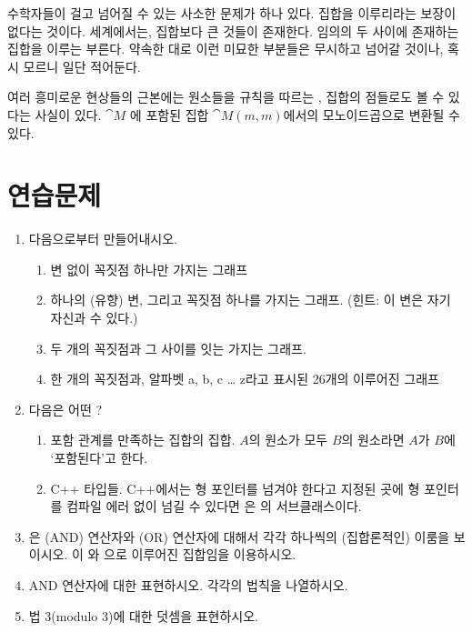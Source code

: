 \noindent
수학자들이 걸고 넘어질 수 있는 사소한 문제가 하나 있다.  집합을 이루리라는 보장이 없다는 것이다.
 세계에서는, 집합보다 큰 것들이 존재한다. 임의의 두 \trObject 사이에 존재하는  집합을 이루는   부른다.
약속한 대로 이런 미묘한 부분들은 무시하고 넘어갈 것이나, 혹시 모르니 일단 적어둔다.

 여러 흥미로운 현상들의 근본에는  원소들을  규칙을 따르는 , 집합의 점들로도 볼 수 있다는 사실이 있다.
$\cat{M}$ 에 포함된   집합 $\cat{M}(m, m)$에서의 모노이드곱으로 변환될 수 있다.

\section{연습문제}

\begin{enumerate}
\tightlist
\item
  다음으로부터  만들어내시오.  

  \begin{enumerate}
  \tightlist
  \item
    변 없이 꼭짓점 하나만 가지는 그래프
  \item
    하나의 (유향) 변, 그리고 꼭짓점 하나를 가지는 그래프.
    (힌트: 이 변은 자기 자신과  수 있다.)
  \item
    두 개의 꼭짓점과 그 사이를 잇는  가지는 그래프.
  \item
    한 개의 꼭짓점과, 알파벳 a, b, c \ldots{} z라고 표시된 26개의  이루어진 그래프
  \end{enumerate}
\item
  다음은 어떤 ?

  \begin{enumerate}
  \tightlist
  \item
    포함 관계를 만족하는 집합의 집합. $A$의 원소가 모두 $B$의 원소라면 $A$가 $B$에 `포함된다'고 한다. %
  \item
    C++ 타입들. C++에서는 형 포인터를 넘겨야 한다고 지정된 곳에 형 포인터를 컴파일 에러 없이 넘길 수 있다면 
    은 의 서브클래스이다.
  \end{enumerate}
\item
  은 \code{\&\&} (AND) 연산자와 \code{||} (OR) 연산자에 대해서 각각 하나씩의 (집합론적인)  이룸을 보이시오.
  이 와 으로 이루어진 집합임을 이용하시오.
\item
  AND 연산자에 대한    표현하시오.  각각의 \trComposition 법칙을 나열하시오.
\item
  법 3(modulo 3)에 대한 덧셈을 \trMonoid {} 표현하시오. %
\end{enumerate}